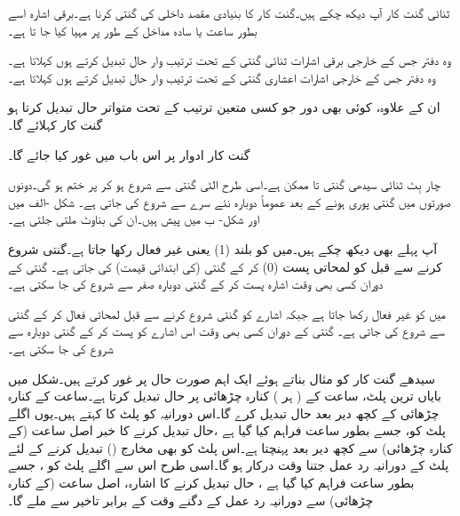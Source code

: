 ثنائی گنت کار آپ دیکھ چکے ہیں۔گنت کار کا بنیادی مقصد  داخلی کی گنتی  کرنا ہے۔برقی اشارہ اسے بطور ساعت یا سادہ مداخل کے طور پر  مہیا کیا جا تا ہے۔

وہ  دفتر جس کے خارجی برقی اشارات  ثنائی گنتی کے تحت ترتیب وار حال تبدیل کرتے ہوں  کہلاتا ہے۔ وہ  دفتر  جس کے  خارجی اشارات اعشاری گنتی کے تحت ترتیب  وار حال تبدیل کرتے ہوں   کہلاتا ہے۔

ان کے علاوہ،   کوئی بھی دور جو کسی متعین ترتیب کے تحت  متواتر  حال تبدیل کرتا ہو  گنت کار کہلائے گا۔

گنت کار ادوار پر اس باب میں غور کیا جائے گا۔

چار بِٹ ثنائی   سیدھی  گنتی    تا    ممکن ہے۔اسی طرح الٹی گنتی   سے  شروع ہو کر      پر ختم ہو گی۔دونوں صورتوں میں گنتی پوری ہونے کے بعد   عموماً دوبارہ نئے سرے سے شروع کی جاتی ہے۔ شکل -الف  میں  اور شکل- ب  میں   پیش ہیں۔ان کی بناوٹ ملتی جلتی ہے۔


 آپ پہلے بھی دیکھ چکے ہیں۔میں   
   کو بلند  (1) یعنی غیر فعال رکھا جاتا ہے۔گنتی شروع کرنے سے قبل     کو لمحاتی  پست  (0) کر کے گنتی   (کی ابتدائی قیمت)   کی جاتی  ہے۔ گنتی کے دوران کسی بھی وقت    اشارہ  پست کر کے گنتی دوبارہ صفر سے شروع کی جا سکتی ہے۔

 میں   کو غیر فعال رکھا جاتا ہے جبکہ   اشارے کو گنتی شروع کرنے سے  قبل لمحاتی فعال کر کے گنتی    سے شروع  کی  جاتی ہے۔ گنتی کے دوران کسی بھی وقت  اس اشارے کو پست کر کے گنتی  دوبارہ   سے شروع کی  جا سکتی ہے۔

سیدھے گنت کار کو مثال  بناتے  ہوئے  ایک اہم صورت حال پر غور کرتے ہیں۔شکل میں بایاں ترین پلٹ، ساعت کے ( ہر ) کنارہ چڑھائی پر حال تبدیل کرتا ہے۔ساعت کے کنارہ چڑھائی کے کچھ دیر بعد 
 حال تبدیل کرے گا۔اس دورانیہ کو پلٹ کا کہتے ہیں۔یوں  اگلے پلٹ  کو، جسے   بطور ساعت فراہم  کیا گیا ہے ،حال تبدیل کرنے کا خبر اصل ساعت (کے کنارہ چڑھائی)   سے کچھ دیر بعد  پہنچتا ہے۔اس پلٹ کو بھی مخارج  ()   تبدیل کرنے کے لئے   پلٹ کے  دورانیہ رد عمل جتنا وقت درکار ہو گا۔اسی طرح اس سے اگلے پلٹ کو ، جسے   بطور  ساعت فراہم کیا گیا ہے ، حال تبدیل کرنے کا اشارہ، اصل ساعت (کے کنارہ چڑھائی)  سے دورانیہ رد عمل کے دگنے وقت کے برابر تاخیر سے ملے گا۔


